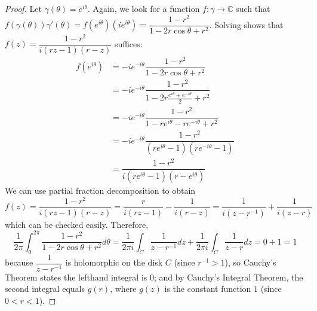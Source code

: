\documentclass[10pt]{article}
\newcommand{\C}{\mathbb{C}}
\begin{document}
\begin{enumerate}
\begin{proof}

Let $\gamma(\theta) = e^{i\theta}$.  Again, we look for a function $f: \gamma \rightarrow \C$ such that $f(\gamma(\theta))\gamma ' (\theta) = f(e^{i\theta})(i e^{i\theta}) = \dfrac{1-r^2}{1 - 2r \cos \theta + r^2}$.  Solving shows that $f(z) = \dfrac{1-r^2}{i(rz-1)(r-z)}$ suffices:
\begin{align*}
f(e^{i\theta}) &= -ie^{-i\theta}\dfrac{1-r^2}{1 - 2r \cos \theta + r^2}
\\
&= -ie^{-i\theta}\dfrac{1-r^2}{1 - 2r\frac{e^{i\theta} + e^{-i\theta}}{2} + r^2}
\\
&= -ie^{-i\theta}\dfrac{1-r^2}{1 - re^{i\theta} - re^{-i\theta} + r^2}
\\
&= -ie^{-i\theta}\dfrac{1-r^2}{(re^{i\theta} - 1)(re^{-i\theta} - 1)}
\\
&= \dfrac{1-r^2}{i(re^{i\theta}-1)(r-e^{i\theta})}
\end{align*}
We can use partial fraction decomposition to obtain
$$
f(z) = \dfrac{1-r^2}{i(rz-1)(r-z)} = \frac{r}{i(rz-1)} - \frac{1}{i(r-z)} = \frac{1}{i(z-r^{-1})} + \frac{1}{i(z-r)}
$$
which can be checked easily.  Therefore,
$$
\frac{1}{2\pi} \int_0^{2\pi} \dfrac{1-r^2}{1 - 2r \cos \theta + r^2}d \theta
=
\frac{1}{2\pi i}\int_C \frac{1}{z-r^{-1}}dz + \frac{1}{2\pi i} \int_C \frac{1}{z-r}dz = 0 + 1 = 1
$$
because $\dfrac{1}{z-r^{-1}}$ is holomorphic on the disk $C$ (since $r^{-1} > 1$), so Cauchy's Theorem states the lefthand integral is $0$; and by Cauchy's Integral Theorem, the second integral equals $g(r)$, where $g(z)$ is the constant function $1$ (since $0 < r < 1$).
\end{proof}

\end{enumerate}
\end{document}
